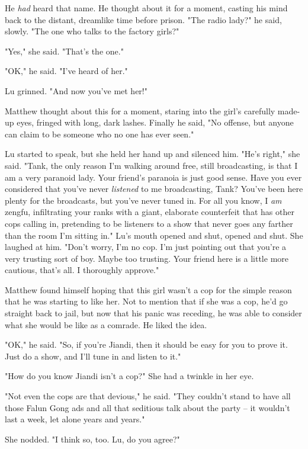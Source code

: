 He \emph{had} heard that name. He thought about it for a moment,
casting his mind back to the distant, dreamlike time before prison.
"The radio lady?" he said, slowly. "The one who talks to the
factory girls?"

"Yes," she said. "That's the one."

"OK," he said. "I've heard of her."

Lu grinned. "And now you've met her!"

Matthew thought about this for a moment, staring into the girl's
carefully made-up eyes, fringed with long, dark lashes. Finally he
said, "No offense, but anyone can claim to be someone who no one
has ever seen."

Lu started to speak, but she held her hand up and silenced him.
"He's right," she said. "Tank, the only reason I'm walking around
free, still broadcasting, is that I am a very paranoid lady. Your
friend's paranoia is just good sense. Have you ever considered that
you've never \emph{listened} to me broadcasting, Tank? You've been
here plenty for the broadcasts, but you've never tuned in. For all
you know, I \emph{am} zengfu, infiltrating your ranks with a giant,
elaborate counterfeit that has other cops calling in, pretending to
be listeners to a show that never goes any farther than the room
I'm sitting in." Lu's mouth opened and shut, opened and shut. She
laughed at him. "Don't worry, I'm no cop. I'm just pointing out
that you're a very trusting sort of boy. Maybe too trusting. Your
friend here is a little more cautious, that's all. I thoroughly
approve."

Matthew found himself hoping that this girl wasn't a cop for the
simple reason that he was starting to like her. Not to mention that
if she was a cop, he'd go straight back to jail, but now that his
panic was receding, he was able to consider what she would be like
as a comrade. He liked the idea.

"OK," he said. "So, if you're Jiandi, then it should be easy for
you to prove it. Just do a show, and I'll tune in and listen to
it."

"How do you know Jiandi isn't a cop?" She had a twinkle in her
eye.

"Not even the cops are that devious," he said. "They couldn't stand
to have all those Falun Gong ads and all that seditious talk about
the party -- it wouldn't last a week, let alone years and years."

She nodded. "I think so, too. Lu, do you agree?"

